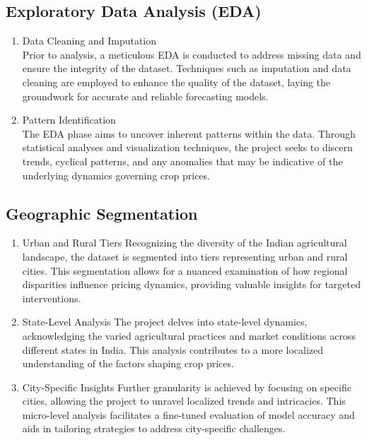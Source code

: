 \subsection{Exploratory Data Analysis (EDA)}
    \begin{enumerate}
        \item Data Cleaning and Imputation\\
            Prior to analysis, a meticulous EDA is conducted to address missing data and ensure the integrity of the dataset. Techniques such as imputation and data cleaning are employed to enhance the quality of the dataset, laying the groundwork for accurate and reliable forecasting models.
        \item Pattern Identification\\
            The EDA phase aims to uncover inherent patterns within the data. Through statistical analyses and visualization techniques, the project seeks to discern trends, cyclical patterns, and any anomalies that may be indicative of the underlying dynamics governing crop prices.
    \end{enumerate}

\subsection{Geographic Segmentation}
    \begin{enumerate}
        \item Urban and Rural Tiers
            Recognizing the diversity of the Indian agricultural landscape, the dataset is segmented into tiers representing urban and rural cities. This segmentation allows for a nuanced examination of how regional disparities influence pricing dynamics, providing valuable insights for targeted interventions.
        \item State-Level Analysis
            The project delves into state-level dynamics, acknowledging the varied agricultural practices and market conditions across different states in India. This analysis contributes to a more localized understanding of the factors shaping crop prices.
        \item City-Specific Insights
            Further granularity is achieved by focusing on specific cities, allowing the project to unravel localized trends and intricacies. This micro-level analysis facilitates a fine-tuned evaluation of model accuracy and aids in tailoring strategies to address city-specific challenges.
    \end{enumerate}

